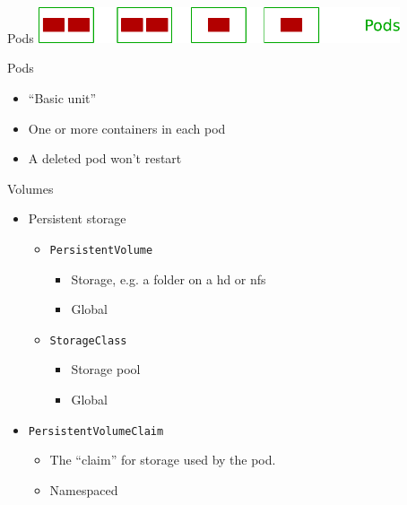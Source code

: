 \documentclass{dcpresentation}
\begin{document}
  \begin{frame}{Pods}
  \centering
  \includegraphics[width=0.8\textwidth]{img/arch-p.pdf}
 \end{frame}
 
 \begin{frame}{Pods}
  \begin{itemize}
   \item ``Basic unit''
   \item One or more containers in each pod
   \item A deleted pod won't restart
  \end{itemize}
 \end{frame}
 
 
 \begin{frame}{Volumes}
  \begin{itemize}
   \item Persistent storage
   \begin{itemize}
   \item \texttt{PersistentVolume}
   \begin{itemize}
    \item Storage, e.g. a folder on a hd or nfs
    \item Global
   \end{itemize}
   \item \texttt{StorageClass}
   \begin{itemize}
    \item Storage pool
    \item Global
   \end{itemize}
   \end{itemize}
   \item \texttt{PersistentVolumeClaim}
   \begin{itemize}
    \item The ``claim'' for storage used by the pod.
    \item Namespaced
   \end{itemize}
  \end{itemize}
 \end{frame}
\end{document}
